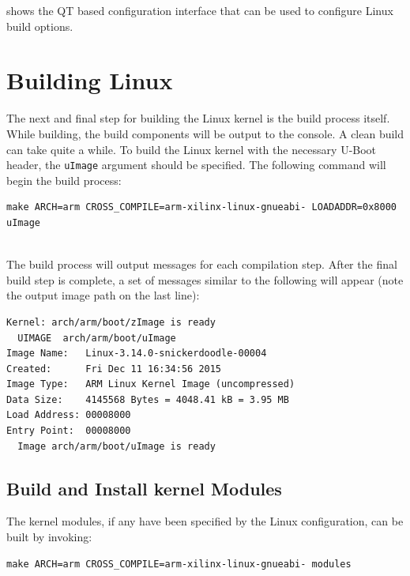 \noindent
{} shows the QT based configuration interface that can be used to configure Linux build options. \\


\section{Building Linux}

The next and final step for building the Linux kernel is the build process itself. While building, the build components will be output to the console. A clean build can take quite a while. To build the Linux kernel with the necessary U-Boot header, the \texttt{uImage} argument should be specified. The following command will begin the build process: \\

\begin{lstlisting}
make ARCH=arm CROSS_COMPILE=arm-xilinx-linux-gnueabi- LOADADDR=0x8000 uImage
\end{lstlisting}


~\\
\noindent
The build process will output messages for each compilation step. After the final build step is complete, a set of messages similar to the following will appear (note the output image path on the last line): \\

\begin{lstlisting}[style=text]
  Kernel: arch/arm/boot/zImage is ready
  UIMAGE  arch/arm/boot/uImage
Image Name:   Linux-3.14.0-snickerdoodle-00004
Created:      Fri Dec 11 16:34:56 2015
Image Type:   ARM Linux Kernel Image (uncompressed)
Data Size:    4145568 Bytes = 4048.41 kB = 3.95 MB
Load Address: 00008000
Entry Point:  00008000
  Image arch/arm/boot/uImage is ready

\end{lstlisting}


\subsection{Build and Install kernel Modules}

The kernel modules, if any have been specified by the Linux configuration, can be built by invoking: \\

\begin{lstlisting}[style=text]
make ARCH=arm CROSS_COMPILE=arm-xilinx-linux-gnueabi- modules
\end{lstlisting}

